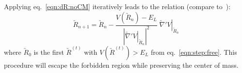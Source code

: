 \documentclass[letter,11pt]{article}
\newcommand{\cvec}[1]{\utilde{#1}}
\newcommand{\laeq}[1]{\label{eqn:#1}}
\newcommand{\refeq}[1]{eq.~\ref{eqn:#1}}
\begin{document}
Applying \refeq{dR:noCM} iteratively leads to the relation (compare to~\cite{wang:2007:geodesics}):
\begin{equation}\laeq{step:escape}
  \cvec{R}_{n+1} = \cvec{R}_{n} -    \frac{V \left(\cvec{R}_n\right) - E_L}{ {\left| {\left. \cvec{\nabla}'V \right|}_{\cvec{R}_n} \right|}^2} \; {\left. \cvec{\nabla}'V \right|}_{\cvec{R}_n}
\end{equation}
where $\cvec{R}_0$ is the first $\cvec{R}^{(t)}$ with $V\left( \cvec{R}^{(t)} \right) > E_L$ from \refeq{step:free}. This procedure will escape the forbidden region while preserving the center of mass.



\end{document}
